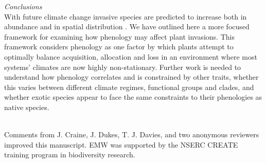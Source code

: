 \documentclass[11pt,a4paper,oneside]{article}
\begin{document}
\noindent \emph{Conclusions}\\
With future climate change invasive species are predicted to increase both in abundance and in spatial distribution \citep{ipcc2007summary,bradley2010}. We have outlined here a more focused framework for examining how phenology may affect plant invasions. This framework considers phenology as one factor by which plants attempt to optimally balance acquisition, allocation and loss in an environment where most systems' climates are now highly non-stationary. Further work is needed to understand how phenology correlates and is constrained by other traits, whether this varies between different climate regimes, functional groups and clades, and whether exotic species appear to face the same constraints to their phenologies as native species.

\\
Comments from J. Craine, J. Dukes, T. J. Davies, and two anonymous reviewers improved this manuscript. EMW was supported by the NSERC CREATE training program in biodiversity research.  
\newpage

\newpage
\end{document}
